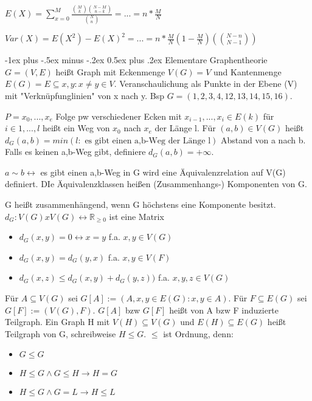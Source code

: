 \documentclass[a4paper]{article}
\makeatletter
\renewcommand{\section}{\@startsection{section}{1}{0mm}%
                                {-1ex plus -.5ex minus -.2ex}%
                                {0.5ex plus .2ex}%
                                {\normalfont\large\bfseries}}
\makeatother
\begin{document}
\begin{multicols}{3}
    $E(X)=\sum_{x=0}^M \frac{\binom{M}{k}\binom{N-M}{n-k}}{\binom{N}{n}}=...=n*\frac{M}{N}$
    
    $Var(X)=E(X^2)-E(X)^2 =...= n*\frac{M}{N}(1-\frac{M}{N})(\binom{N-n}{N-1})$
    
    \section{Elementare Graphentheorie}
    $G=(V,E)$ heißt Graph mit Eckenmenge $V(G)=V$ und Kantenmenge $E(G)=E\subseteq {{x,y}:x\not=y \in V}$. Veranschaulichung als Punkte in der Ebene (V) mit "Verknüpfunglinien" von x nach y. Bsp $G=({1,2,3,4},{12,13,14,15,16})$.
    
    $P=x_0,...,x_e$ Folge pw verschiedener Ecken mit $x_{i-1},...,x_i \in E(k)$ für $i\in{1,...,l}$ heißt ein Weg von $x_0$ nach $x_e$ der Länge l. Für $(a,b)\in V(G)$ heißt $d_G(a,b)=min(l: \text{ es gibt einen a,b-Weg der Länge l} )$ Abstand von a nach b. Falls es keinen a,b-Weg gibt, definiere $d_G(a,b)=+\infty$.
    
    $a\sim b \leftrightarrow$ es gibt einen a,b-Weg in G wird eine Äquivalenzrelation auf V(G) definiert. DIe Äquivalenzklassen heißen (Zusammenhangs-) Komponenten von G.
    
    G heißt zusammenhängend, wenn G höchstens eine Komponente besitzt. $d_G: V(G) x V(G) \leftrightarrow \mathbb{R}_{\geq 0}$ ist eine Matrix
    \begin{itemize}
        \item $d_G(x,y)=0 \leftrightarrow x=y$ f.a. $x,y \in V(G)$
        \item $d_G(x,y)=d_G(y,x)$ f.a. $x,y\in V(F)$
        \item $d_G(x,z)\leq d_G(x,y) + d_G(y,z))$ f.a. $x,y,z \in V(G)$
    \end{itemize}
    
    Für $A\subseteq V(G)$ sei $G[A]:= (A, {x,y\in E(G):x,y\in A})$. Für $F\subseteq E(G)$ sei $G[F]:=(V(G), F)$. $G[A]$ bzw $G[F]$ heißt von A bzw F induzierte Teilgraph. Ein Graph H mit $V(H)\subseteq V(G)$ und $E(H)\subseteq E(G)$ heißt Teilgraph von G, schreibweise $H\leq G$. $\leq$ ist Ordnung, denn:
    \begin{itemize}
        \item $G\leq G$
        \item $H\leq G \wedge G\leq H \rightarrow H=G$
        \item $H\leq G \wedge G=L \rightarrow H\leq L$
    \end{itemize}
    

\end{multicols}
\end{document}
